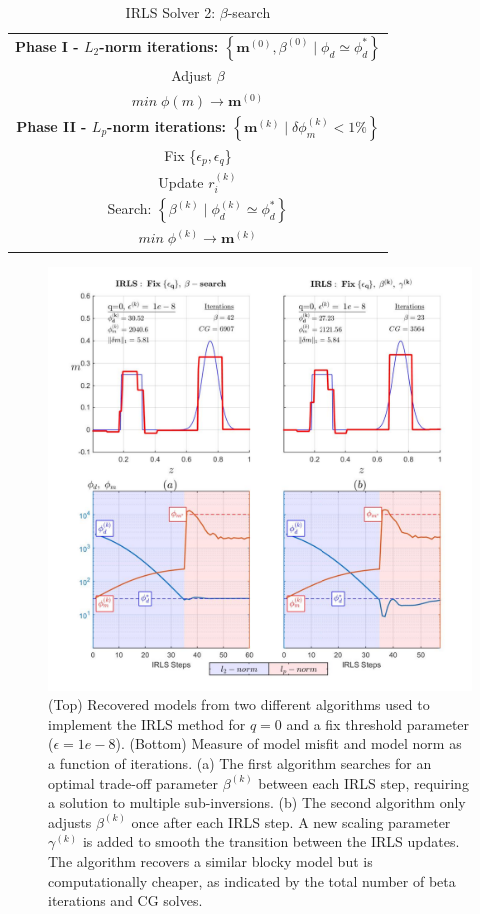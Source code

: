 \begin{table}[h!]
\centering
\caption{IRLS Solver 2: $\beta$-search}
\label{tbl:IRLS_v2}
\renewcommand{\arraystretch}{1.5}
\begin{tabular}{|c|}\hline
\textbf{Phase I - $L_2$-norm iterations:  $\left\{ \mathbf{m}^{(0)}, \beta^{(0)} \mid \phi_d \simeq \phi_d^* \right \}$}\\
Adjust $\beta$ \\
$min\; \phi(m)  \rightarrow \mathbf{m}^{(0)}$ \\ \hline
\textbf{Phase II - $L_p$-norm iterations: $\left\{  \mathbf{m}^{(k)} \mid \delta \phi_m^{(k)} < 1\% \right \}$ }\\
Fix \{$\epsilon_p,\epsilon_q$\}\\
Update $r_i^{(k)}$\\
Search:   $\left\{  \beta^{(k)} \mid \phi_d^{(k)} \simeq \phi_d^* \right \}$\\
$min\; \phi^{(k)}  \rightarrow \mathbf{m}^{(k)}$\\ \hline
\end{tabular}
\end{table}

\begin{figure}[p]
\includegraphics[scale=0.6]{1D_IRLS_algo2}
\caption{(Top) Recovered models from two different algorithms used to implement the IRLS method for $q=0$ and a fix threshold parameter ($\epsilon=1e-8$). (Bottom) Measure of model misfit and model norm as a function of iterations. (a) The first algorithm searches for an optimal trade-off parameter $\beta^{(k)}$ between each IRLS step, requiring a solution to multiple sub-inversions. (b) The second algorithm only adjusts $\beta^{(k)}$ once after each IRLS step. A new scaling parameter $\gamma^{(k)}$ is added to smooth the transition between the IRLS updates. The algorithm recovers a similar blocky model but is computationally cheaper, as indicated by the total number of beta iterations and CG solves.}
\label{fig:1D_IRLS_algo2}
\end{figure}


